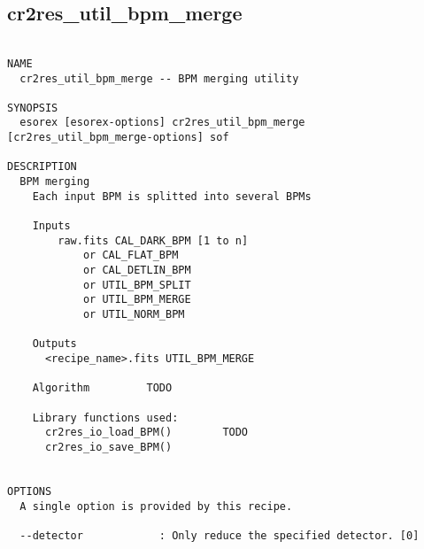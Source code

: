 \subsection{cr2res\_util\_bpm\_merge}
\begin{verbatim}

NAME
  cr2res_util_bpm_merge -- BPM merging utility

SYNOPSIS
  esorex [esorex-options] cr2res_util_bpm_merge [cr2res_util_bpm_merge-options] sof

DESCRIPTION
  BPM merging                                                             
    Each input BPM is splitted into several BPMs                          
                                                                          
    Inputs                                                                
     	raw.fits CAL_DARK_BPM [1 to n]                   
            or CAL_FLAT_BPM                            
            or CAL_DETLIN_BPM                          
            or UTIL_BPM_SPLIT                          
            or UTIL_BPM_MERGE                          
            or UTIL_NORM_BPM                           
                                                                          
    Outputs                                                               
      <recipe_name>.fits UTIL_BPM_MERGE
                                                                          
    Algorithm         TODO                                                
                                                                          
    Library functions used:                                               
      cr2res_io_load_BPM()        TODO                                    
      cr2res_io_save_BPM()                                                
  

OPTIONS
  A single option is provided by this recipe.

  --detector            : Only reduce the specified detector. [0]

\end{verbatim}
